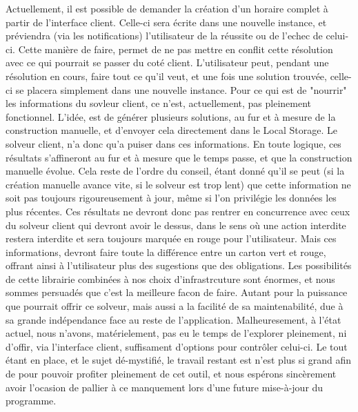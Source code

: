 Actuellement, il est possible de demander la création d'un horaire complet à partir de l'interface client. Celle-ci sera écrite dans une nouvelle instance, et préviendra (via les notifications) l'utilisateur de la réussite ou de l'echec de celui-ci.  Cette manière de faire, permet de ne pas mettre en conflit cette résolution avec ce qui pourrait se passer du coté client. L'utilisateur peut, pendant une résolution en cours, faire tout ce qu'il veut, et une fois une solution trouvée, celle-ci se placera simplement dans une nouvelle instance.
Pour ce qui est de "nourrir" les informations du sovleur client, ce n'est, actuellement, pas pleinement fonctionnel. L'idée, est de générer plusieurs solutions, 
au fur et à mesure de la construction manuelle, et d'envoyer cela directement dans le Local Storage. Le solveur client, n'a donc qu'a puiser dans ces informations.
En toute logique, ces résultats s'affineront au fur et à mesure que le temps passe, et que la construction manuelle évolue. Cela reste de l'ordre du conseil, étant donné qu'il se peut (si la création manuelle avance vite, si le solveur est trop lent) que cette information ne soit pas toujours rigoureusement à jour, même si l'on privilégie les données les plus récentes.  Ces résultats ne devront donc pas rentrer en concurrence avec ceux du solveur client qui devront avoir le dessus, dans le sens où une action interdite restera interdite et sera toujours marquée en rouge pour l'utilisateur. 
Mais ces informations, devront faire toute la différence entre un carton vert et rouge, offrant ainsi à l'utilisateur plus des sugestions que des obligations. 
\newline
\indent
Les possibilités de cette librairie combinées à nos choix d'infrastrcuture sont énormes, et nous sommes persuadés que c'est la meilleure facon de faire. Autant pour la puissance que pourrait offrir ce solveur, mais aussi a la facilité de sa maintenabilité, due à sa grande indépendance face au reste de l'application.
Malheuresement, à l'état actuel, nous n'avons, matérielement, pas eu le temps de l'explorer pleinement, ni d'offir, via l'interface client, suffisament d'options pour contrôler celui-ci.
Le tout étant en place, et le sujet dé-mystifié, le travail restant est n'est plus si grand afin de pour pouvoir profiter pleinement de cet outil, et nous espérons sincèrement avoir l'ocasion de pallier à ce manquement lors d'une future mise-à-jour du programme.
